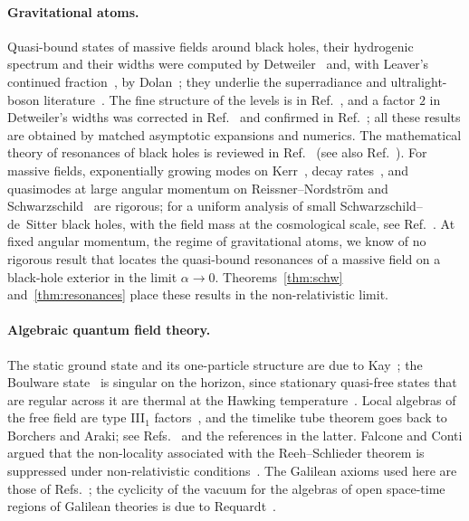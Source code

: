 \documentclass[%
 aip,
 jmp,
 amsmath,amssymb,
 reprint, onecolumn
]{revtex4-1}
\theoremstyle{definition}
\theoremstyle{remark}
\begin{document}
\paragraph{Gravitational atoms.} Quasi-bound states of massive fields
around black holes, their hydrogenic spectrum and their widths were
computed by Detweiler~\cite{Detweiler1980} and, with Leaver's continued
fraction~\cite{Leaver1985}, by Dolan~\cite{Dolan2007}; they underlie the
superradiance and ultralight-boson literature~\cite{ArvanitakiDubovsky2011,
BaumannChiaPorto2019,BaumannChiaStoutTerHaar2019,BritoCardosoPani2020,
Banerjee2020}. The fine structure of the levels is in
Ref.~, and a factor $2$ in Detweiler's
widths was corrected in Ref.~
and confirmed in Ref.~; all these results are
obtained by matched asymptotic expansions and numerics. The mathematical
theory of resonances of black holes is reviewed in
Ref.~ (see also
Ref.~). For massive fields,
exponentially growing modes on Kerr~\cite{ShlapentokhRothman2014}, decay
rates~\cite{PasqualottoShlapentokhRothmanVandeMoortel2023}, and
quasimodes at large angular momentum on Reissner--Nordstr\"om and
Schwarzschild~\cite{ShlapentokhRothmanVandeMoortel2023} are rigorous; for a
uniform analysis of small Schwarzschild--de~Sitter black holes, with the
field mass at the cosmological scale, see Ref.~.
At fixed angular momentum, the regime of gravitational atoms, we know of
no rigorous result that locates the quasi-bound resonances of a massive
field on a black-hole exterior in the limit $\alpha\to0$. Theorems~\ref{thm:schw} and~\ref{thm:resonances}
place these results in the non-relativistic limit.

\paragraph{Algebraic quantum field theory.} The static ground state and
its one-particle structure are due to Kay~\cite{Kay1978}; the Boulware
state~\cite{Boulware1975} is singular on the horizon, since stationary
quasi-free states that are regular across it are thermal at the Hawking
temperature~\cite{KayWald1991}.
Local algebras of the free field are type III$_1$
factors~\cite{Araki1964b,BuchholzDAntoniFredenhagen1987,Verch1997}, and
the timelike tube theorem goes back to Borchers and Araki; see
Refs.~ and the references
in the latter. Falcone and Conti argued that the non-locality associated
with the Reeh--Schlieder theorem is suppressed under non-relativistic
conditions~\cite{FalconeConti2024}. The Galilean axioms used here are those of
Refs.~; the cyclicity of the vacuum
for the algebras of open space-time regions of Galilean theories is due
to Requardt~\cite{Requardt1982}.
\end{document}
